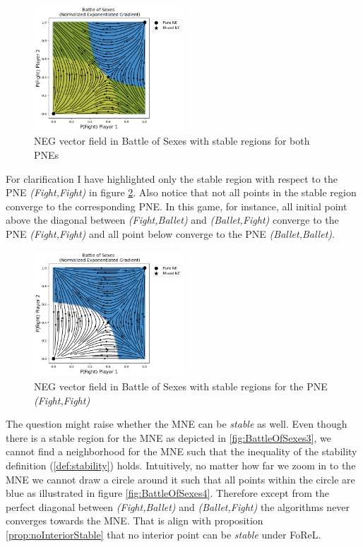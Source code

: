 \begin{figure}[H]
    \centering
    \includegraphics[width=0.5\textwidth]{logos/BattleOfSexes5.png}
    \caption{NEG vector field in Battle of Sexes with stable regions for both PNEs}
    \label{fig:BattleOfSexes5}
\end{figure}

For clarification I have highlighted only the stable region with respect to the PNE \textit{(Fight,Fight)} in figure \ref{fig:BattleOfSexes2}. Also notice that not all points in the stable region converge to the corresponding PNE. In this game, for instance, all initial point above the diagonal between \textit{(Fight,Ballet)} and \textit{(Ballet,Fight)} converge to the PNE \textit{(Fight,Fight)} and all point below converge to the PNE \textit{(Ballet,Ballet)}. 

\begin{figure}[H]
    \centering
    \includegraphics[width=0.5\textwidth]{logos/BattleOfSexes2.png}
    \caption{NEG vector field in Battle of Sexes with stable regions for the PNE \textit{(Fight,Fight)}}
    \label{fig:BattleOfSexes2}
\end{figure}

The question might raise whether the MNE can be \textit{stable} as well. Even though there is a stable region for the MNE as depicted in \ref{fig:BattleOfSexes3}, we cannot find a neighborhood for the MNE such that the inequality of the stability definition (\ref{def:stability}) holds. Intuitively, no matter how far we zoom in to the MNE we cannot draw a circle around it such that all points within the circle are blue as illustrated in figure \ref{fig:BattleOfSexes4}. Therefore except from the perfect diagonal between \textit{(Fight,Ballet)} and \textit{(Ballet,Fight)} the algorithms never converges towards the MNE. That is align with proposition \ref{prop:noInteriorStable} that no interior point can be \textit{stable} under FoReL.  


